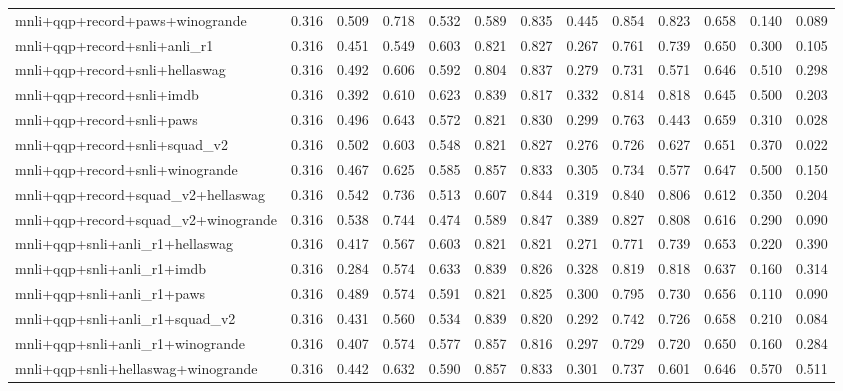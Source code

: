 \begin{table}[t]
\begin{tabular}{lrrrrrrrrrrrr}
    mnli+qqp+record+paws+winogrande & 0.316 & 0.509 & 0.718 & 0.532 & 0.589 & 0.835 & 0.445 & 0.854 & 0.823 & 0.658 & 0.140 & 0.089 \\
    mnli+qqp+record+snli+anli\_r1 & 0.316 & 0.451 & 0.549 & 0.603 & 0.821 & 0.827 & 0.267 & 0.761 & 0.739 & 0.650 & 0.300 & 0.105 \\
    mnli+qqp+record+snli+hellaswag & 0.316 & 0.492 & 0.606 & 0.592 & 0.804 & 0.837 & 0.279 & 0.731 & 0.571 & 0.646 & 0.510 & 0.298 \\
    mnli+qqp+record+snli+imdb & 0.316 & 0.392 & 0.610 & 0.623 & 0.839 & 0.817 & 0.332 & 0.814 & 0.818 & 0.645 & 0.500 & 0.203 \\
    mnli+qqp+record+snli+paws & 0.316 & 0.496 & 0.643 & 0.572 & 0.821 & 0.830 & 0.299 & 0.763 & 0.443 & 0.659 & 0.310 & 0.028 \\
    mnli+qqp+record+snli+squad\_v2 & 0.316 & 0.502 & 0.603 & 0.548 & 0.821 & 0.827 & 0.276 & 0.726 & 0.627 & 0.651 & 0.370 & 0.022 \\
    mnli+qqp+record+snli+winogrande & 0.316 & 0.467 & 0.625 & 0.585 & 0.857 & 0.833 & 0.305 & 0.734 & 0.577 & 0.647 & 0.500 & 0.150 \\
    mnli+qqp+record+squad\_v2+hellaswag & 0.316 & 0.542 & 0.736 & 0.513 & 0.607 & 0.844 & 0.319 & 0.840 & 0.806 & 0.612 & 0.350 & 0.204 \\
    mnli+qqp+record+squad\_v2+winogrande & 0.316 & 0.538 & 0.744 & 0.474 & 0.589 & 0.847 & 0.389 & 0.827 & 0.808 & 0.616 & 0.290 & 0.090 \\
    mnli+qqp+snli+anli\_r1+hellaswag & 0.316 & 0.417 & 0.567 & 0.603 & 0.821 & 0.821 & 0.271 & 0.771 & 0.739 & 0.653 & 0.220 & 0.390 \\
    mnli+qqp+snli+anli\_r1+imdb & 0.316 & 0.284 & 0.574 & 0.633 & 0.839 & 0.826 & 0.328 & 0.819 & 0.818 & 0.637 & 0.160 & 0.314 \\
    mnli+qqp+snli+anli\_r1+paws & 0.316 & 0.489 & 0.574 & 0.591 & 0.821 & 0.825 & 0.300 & 0.795 & 0.730 & 0.656 & 0.110 & 0.090 \\
    mnli+qqp+snli+anli\_r1+squad\_v2 & 0.316 & 0.431 & 0.560 & 0.534 & 0.839 & 0.820 & 0.292 & 0.742 & 0.726 & 0.658 & 0.210 & 0.084 \\
    mnli+qqp+snli+anli\_r1+winogrande & 0.316 & 0.407 & 0.574 & 0.577 & 0.857 & 0.816 & 0.297 & 0.729 & 0.720 & 0.650 & 0.160 & 0.284 \\
    mnli+qqp+snli+hellaswag+winogrande & 0.316 & 0.442 & 0.632 & 0.590 & 0.857 & 0.833 & 0.301 & 0.737 & 0.601 & 0.646 & 0.570 & 0.511 \\

\end{tabular}
\end{table}
